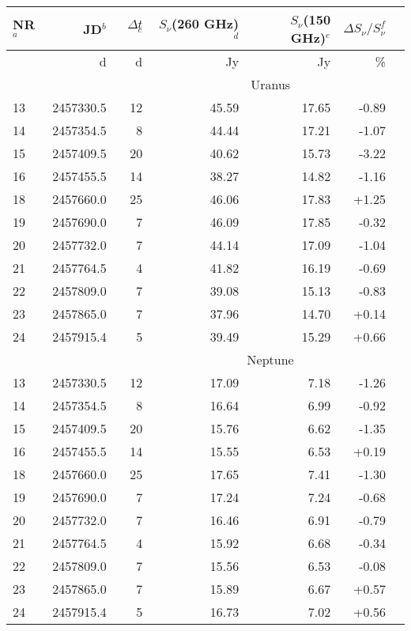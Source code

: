 \begin{table}[p]
\centering
\begin{tabular}{|l|r|r|r|r|r|r|}
\hline
NR$^{a}$  & JD$^{b}$ & $\Delta t$ $^{c}$ & $S_{\nu}$(260 GHz)  $^{d}$& $S_{\nu}$(150  GHz)$^{e}$  & $\Delta S_{\nu}/  S_{\nu} ^{f}$  \\
\hline
         & d  &  d        & Jy               & Jy                 &                                                                    \%  \\
\hline
         &    &            & \multicolumn{3}{|c|}{Uranus}\\
\hline
13 & 2457330.5 &  12 & 45.59 & 17.65 & -0.89\\
14 & 2457354.5 &  8 & 44.44 & 17.21 & -1.07\\
15 & 2457409.5 &  20 & 40.62 & 15.73 & -3.22\\
16 & 2457455.5 &  14 & 38.27 & 14.82 & -1.16\\
18 & 2457660.0 &  25 & 46.06 & 17.83 & +1.25\\
19 & 2457690.0 &  7 & 46.09 & 17.85 & -0.32\\
20 & 2457732.0 &  7 & 44.14 & 17.09 & -1.04\\
21 & 2457764.5 &  4 & 41.82 & 16.19 & -0.69\\
22 & 2457809.0 &  7 & 39.08 & 15.13 & -0.83\\
23 & 2457865.0 &  7 & 37.96 & 14.70 & +0.14\\
24 & 2457915.4 &  5 &  39.49 & 15.29 & +0.66 \\
\hline
         &    &            & \multicolumn{3}{|c|}{Neptune}\\
\hline
13 & 2457330.5 &  12 & 17.09 & 7.18 & -1.26\\
14 & 2457354.5 &  8 & 16.64 & 6.99 & -0.92\\
15 & 2457409.5 &  20 & 15.76 & 6.62 & -1.35\\
16 & 2457455.5 &  14 & 15.55 & 6.53 & +0.19\\
18 & 2457660.0 &  25 & 17.65 & 7.41 & -1.30\\
19 & 2457690.0 &  7 & 17.24 & 7.24 & -0.68\\
20 & 2457732.0 &  7 & 16.46 & 6.91 & -0.79\\
21 & 2457764.5 &  4 & 15.92 & 6.68 & -0.34\\
22 & 2457809.0 &  7 & 15.56 & 6.53 & -0.08\\
23 & 2457865.0 &  7 & 15.89 & 6.67 & +0.57\\
24 & 2457915.4 &  5 & 16.73 & 7.02 & +0.56 \\

\end{tabular}
\end{table}
